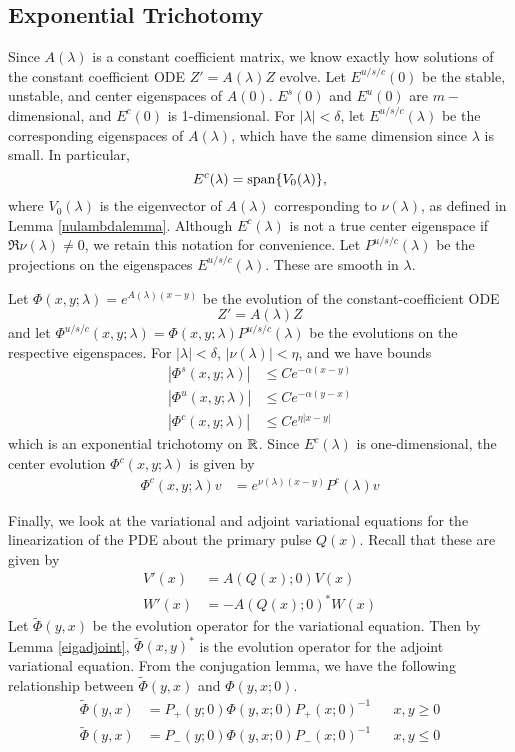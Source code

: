 \documentclass[thesis.tex]{subfiles}
\begin{document}
\subsection{Exponential Trichotomy}

Since $A(\lambda)$ is a constant coefficient matrix, we know exactly how solutions of the constant coefficient ODE $Z' = A(\lambda)Z$ evolve. Let $E^{u/s/c}(0)$ be the stable, unstable, and center eigenspaces of $A(0)$. $E^s(0)$ and $E^u(0)$ are $m-$dimensional, and $E^c(0)$ is 1-dimensional. For $|\lambda| < \delta$, let $E^{u/s/c}(\lambda)$ be the corresponding eigenspaces of $A(\lambda)$, which have the same dimension since $\lambda$ is small. In particular, 
\[
E^c(\lambda) = \operatorname{span}\{ V_0(\lambda) \},
\]
where $V_0(\lambda)$ is the eigenvector of $A(\lambda)$ corresponding to $\nu(\lambda)$, as defined in Lemma \ref{nulambdalemma}. Although $E^c(\lambda)$ is not a true center eigenspace if $\Re \nu(\lambda) \neq 0$, we retain this notation for convenience. Let $P^{u/s/c}(\lambda)$ be the projections on the eigenspaces $E^{u/s/c}(\lambda)$. These are smooth in $\lambda$. 

Let $\Phi(x, y; \lambda) = e^{A(\lambda)(x-y)}$ be the evolution of the constant-coefficient ODE
\[
Z' = A(\lambda) Z
\]
and let $\Phi^{u/s/c}(x, y; \lambda) = \Phi(x, y; \lambda)P^{u/s/c}(\lambda)$ be the evolutions on the respective eigenspaces. For $|\lambda| < \delta$, $|\nu(\lambda)| < \eta$, and we have bounds
\begin{equation}\label{Zevolbounds}
\begin{aligned}
|\Phi^s(x, y; \lambda)| &\leq C e^{-\alpha(x - y)} \\
|\Phi^u(x, y; \lambda)| &\leq C e^{-\alpha(y - x)} \\
|\Phi^c(x, y; \lambda)| &\leq C e^{\eta|x - y|} 
\end{aligned}
\end{equation}
which is an exponential trichotomy on $\mathbb{R}$. Since $E^c(\lambda)$ is one-dimensional, the center evolution $\Phi^c(x, y; \lambda)$ is given by
\begin{align}\label{centerevol}
\Phi^c(x, y; \lambda) v &= e^{\nu(\lambda)(x - y)} P^c(\lambda)v
\end{align}

Finally, we look at the variational and adjoint variational equations for the linearization of the PDE about the primary pulse $Q(x)$. Recall that these are given by 
\begin{align*}
V'(x) &= A(Q(x); 0) V(x) \\
W'(x) &= -A(Q(x); 0)^* W(x)
\end{align*}
Let $\tilde{\Phi}(y, x)$ be the evolution operator for the variational equation. Then by Lemma \ref{eigadjoint}, $\tilde{\Phi}(x, y)^*$ is the evolution operator for the adjoint variational equation. From the conjugation lemma, we have the following relationship between $\tilde{\Phi}(y, x)$ and $\Phi(y, x; 0)$.
\begin{align*}
\tilde{\Phi}(y, x) &= P_+(y; 0) \Phi(y, x; 0) P_+(x; 0)^{-1} && x, y \geq 0 \\
\tilde{\Phi}(y, x) &= P_-(y; 0) \Phi(y, x; 0) P_-(x; 0)^{-1} && x, y \leq 0
\end{align*}
\end{document}
